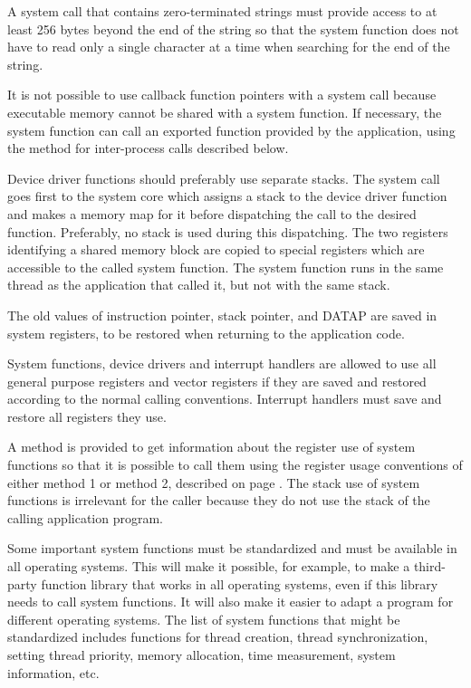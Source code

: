 \documentclass[forwardcom.tex]{subfiles}
\begin{document}
A system call that contains zero-terminated strings must provide access to at least 256 bytes beyond the end of the string so that the system function does not have to read only a single character at a time when searching for the end of the string.
\vspace{2mm}

It is not possible to use callback function pointers with a system call because executable memory cannot be shared with a system function. If necessary, the system function can call an exported function provided by the application, using the method for inter-process calls described below.
\vspace{2mm}

Device driver functions should preferably use separate stacks. The system call goes first to the system core which assigns a stack to the device driver function and makes a memory map for it before dispatching the call to the desired function. Preferably, no stack is used during this dispatching. The two registers identifying a shared memory block are copied to special registers which are accessible to the called system function. The system function runs in the same thread as the application that called it, but not with the same stack. 
\vspace{2mm}

The old values of instruction pointer, stack pointer, and DATAP are saved in system registers, to be restored when returning to the application code. 
\vspace{2mm}

System functions, device drivers and interrupt handlers are allowed to use all general purpose registers and vector registers if they are saved and restored according to the normal calling conventions. Interrupt handlers must save and restore all registers they use. 
\vspace{2mm}

A method is provided to get information about the register use of system functions so that it is possible to call them using the register usage conventions of either method 1 or method 2, described on page \pageref{chap:registerUsageConvention}. The stack use of system functions is irrelevant for the caller because they do not use the stack of the calling application program. 
\vspace{2mm}

Some important system functions must be standardized and must be available in all operating systems. This will make it possible, for example, to make a third-party function library that works in all operating systems, even if this library needs to call system functions. It will also make it easier to adapt a program for different operating systems. The list of system functions that might be standardized includes functions for thread creation, thread synchronization, setting thread priority, memory allocation, time measurement, system information, etc. 
\vspace{2mm}
\end{document}

